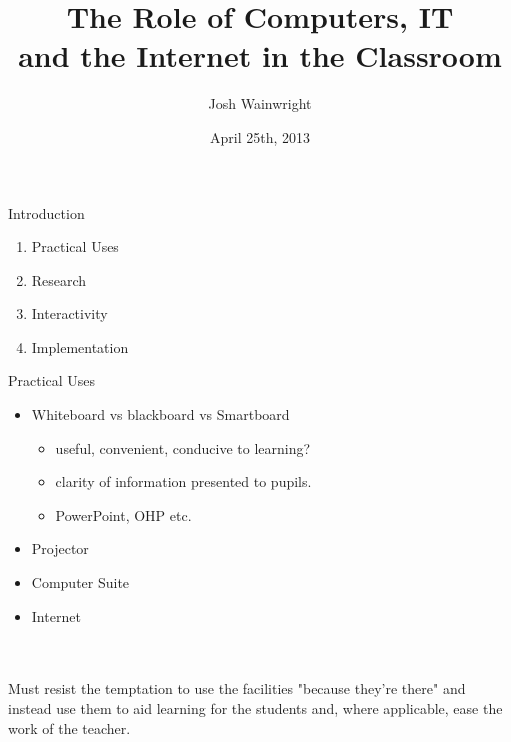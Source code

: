 \documentclass{beamer}
\title[Role of IT in the Classroom]{The Role of Computers, IT\\and the Internet in the Classroom}
\author{Josh Wainwright}
\institute{King Edward VI Five Ways School\\ Bartley Green}
\date{April 25th, 2013}
\begin{document}
\begin{frame}
\titlepage
\end{frame}


\begin{frame}{Introduction}
    \begin{enumerate}
        \item Practical Uses
        \item Research
        \item Interactivity
        \item Implementation
    \end{enumerate}
\end{frame}

\begin{frame}{Practical Uses}
    \begin{itemize}
        \item Whiteboard vs blackboard vs Smartboard
        \begin{itemize}
            \item useful, convenient, conducive to learning?
            \item clarity of information presented to pupils.
            \item PowerPoint, OHP etc.
        \end{itemize}
        \item Projector
        \item Computer Suite
        \item Internet
        \end{itemize}
    \\~\\
    \pause
    Must resist the temptation to use the facilities "because they're there" and instead use them to aid learning for the students and, where applicable, ease the work of the teacher.
\end{frame}
\end{document}
